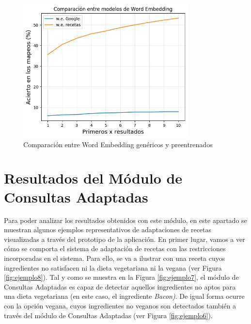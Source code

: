 \begin{figure}[H]
    \centering
    \includegraphics[width=0.80\textwidth]{imagenes/resultados/plot/xx.png}
    \caption{Comparación entre Word Embedding genéricos y preentrenados}
    \label{fig:comp}
\end{figure}




\section{Resultados del Módulo de Consultas Adaptadas}\label{sec:res_adap}

Para poder analizar los resultados obtenidos con este módulo, en este apartado se muestran algunos ejemplos representativos de adaptaciones de recetas visualizadas a través del prototipo de la aplicación. En primer lugar, vamos a ver cómo se comporta el sistema de adaptación de recetas con las restricciones incorporadas en el sistema. Para ello, se va a ilustrar con una receta cuyos ingredientes no satisfacen ni la dieta vegetariana ni la vegana (ver Figura \ref{fig:ejemplo8}). Tal y como se muestra en la Figura \ref{fig:ejemplo7}, el módulo de Consultas Adaptadas es capaz de detectar aquellos ingredientes no aptos para una dieta vegetariana (en este caso, el ingrediente \textit{Bacon)}. De igual forma ocurre con la opción vegana, cuyos ingredientes no veganos son detectados también a través del módulo de Consultas Adaptadas (ver Figura \ref{fig:ejemplo6}).


